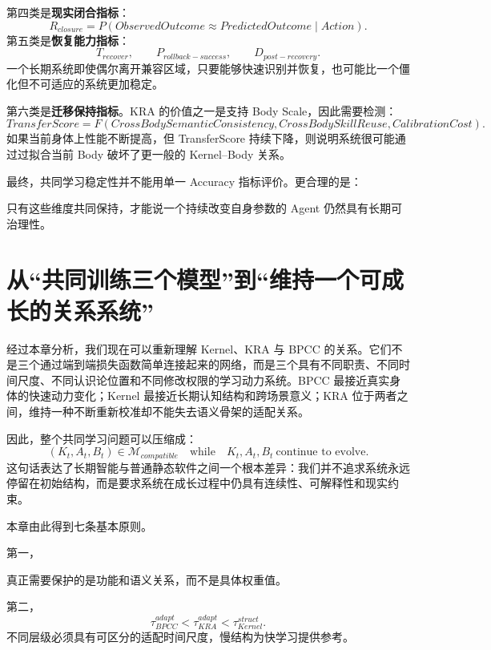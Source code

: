 第四类是\textbf{现实闭合指标}：
\[
R_{closure}
=
P
\left(
ObservedOutcome
\approx
PredictedOutcome
\mid
Action
\right).
\]
第五类是\textbf{恢复能力指标}：
\[
T_{recover},
\qquad
P_{rollback-success},
\qquad
D_{post-recovery}.
\]
一个长期系统即使偶尔离开兼容区域，只要能够快速识别并恢复，也可能比一个僵化但不可适应的系统更加稳定。

第六类是\textbf{迁移保持指标}。KRA 的价值之一是支持 Body Scale，因此需要检测：
\[
TransferScore
=
F
\left(
CrossBodySemanticConsistency,
CrossBodySkillReuse,
CalibrationCost
\right).
\]
如果当前身体上性能不断提高，但 TransferScore 持续下降，则说明系统很可能通过过拟合当前 Body 破坏了更一般的 Kernel--Body 关系。

最终，共同学习稳定性并不能用单一 Accuracy 指标评价。更合理的是：
\begin{statementbox}
\centering
{}
\end{statementbox}
只有这些维度共同保持，才能说一个持续改变自身参数的 Agent 仍然具有长期可治理性。

\section{从“共同训练三个模型”到“维持一个可成长的关系系统”}

经过本章分析，我们现在可以重新理解 Kernel、KRA 与 BPCC 的关系。它们不是三个通过端到端损失函数简单连接起来的网络，而是三个具有不同职责、不同时间尺度、不同认识论位置和不同修改权限的学习动力系统。BPCC 最接近真实身体的快速动力变化；Kernel 最接近长期认知结构和跨场景意义；KRA 位于两者之间，维持一种不断重新校准却不能失去语义骨架的适配关系。

因此，整个共同学习问题可以压缩成：
\[
\boxed{
(K_t,A_t,B_t)\in
\mathcal M_{compatible}
\quad
\text{while}
\quad
K_t,A_t,B_t
\ \text{continue to evolve}.
}
\]
这句话表达了长期智能与普通静态软件之间一个根本差异：我们并不追求系统永远停留在初始结构，而是要求系统在成长过程中仍具有连续性、可解释性和现实约束。

本章由此得到七条基本原则。

第一，
\begin{statementbox}
\centering
{}
\end{statementbox}
真正需要保护的是功能和语义关系，而不是具体权重值。

第二，
\[
\boxed{
\tau_{BPCC}^{adapt}
<
\tau_{KRA}^{adapt}
<
\tau_{Kernel}^{struct}.
}
\]
不同层级必须具有可区分的适配时间尺度，慢结构为快学习提供参考。

